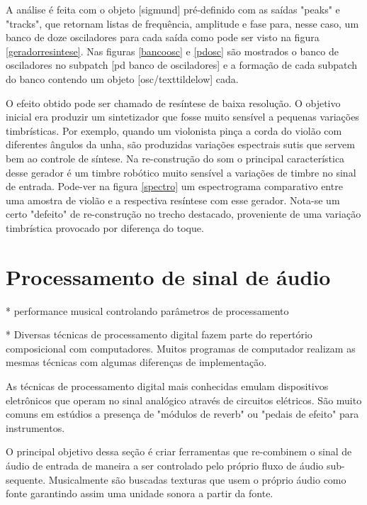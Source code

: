 \documentclass[draft]{ppgmus}
\begin{document}
A análise é feita com o objeto [sigmund\texttildelow] pré-definido com
as saídas "peaks" e "tracks", que retornam listas de frequência, amplitude e 
fase para, nesse caso, um banco de doze osciladores para cada saída como pode 
ser visto na figura \ref{geradorresintese}.
Nas figuras \ref{bancoosc} e \ref{pdosc} são mostrados o banco de osciladores no subpatch
[pd banco de osciladores] e a formação de cada subpatch do banco contendo um objeto [osc/texttildelow]
cada. 
 
O efeito obtido pode ser chamado de resíntese de baixa resolução. O objetivo
inicial era produzir um sintetizador que fosse muito sensível a pequenas
variações timbrísticas. Por exemplo, quando um violonista pinça a corda do violão
com diferentes ângulos da unha, são produzidas variações espectrais sutis que servem
bem ao controle de síntese. Na re-construção do som o principal característica desse
gerador é um timbre robótico muito sensível a variações de timbre no sinal de entrada.
Pode-ver na figura \ref{spectro} um espectrograma comparativo entre uma amostra
de violão e a respectiva resíntese com esse gerador. Nota-se um certo "defeito"
de re-construção no trecho destacado, proveniente de uma variação timbrística provocado
por diferença do toque. 




\pagebreak

\section{Processamento de sinal de áudio}


* performance musical controlando parâmetros de processamento

* Diversas técnicas de processamento digital fazem parte do repertório
composicional com computadores. Muitos programas de computador realizam
as mesmas técnicas com algumas diferenças de implementação.

As técnicas de processamento digital mais conhecidas emulam dispositivos
eletrônicos que operam no sinal analógico através de circuitos elétricos.
São muito comuns em estúdios a presença de "módulos de reverb" ou 
"pedais de efeito" para instrumentos. 

O principal objetivo dessa seção é criar ferramentas que re-combinem
o sinal de áudio de entrada de maneira a ser controlado pelo próprio
fluxo de áudio sub-sequente. Musicalmente são buscadas texturas que usem
o próprio áudio como fonte garantindo assim uma unidade sonora a partir da fonte.
\end{document}
